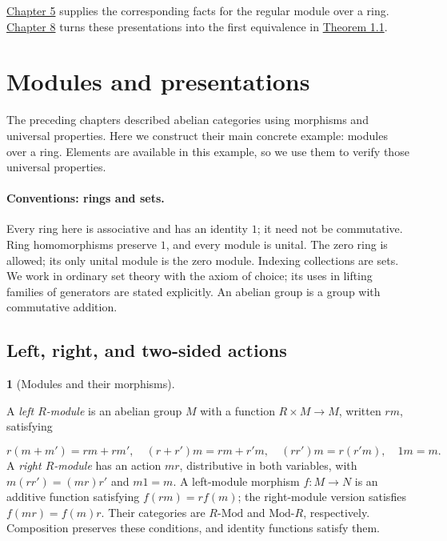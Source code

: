 \documentclass[11pt,a4paper]{article}
\newcommand{\mathheading}{}
\theoremstyle{plain}
\theoremstyle{definition}
\newtheorem*{definitionstatement}{\mathheading}
\newenvironment{mathdefinition}[3]{\renewcommand{\mathheading}{#1 #2}\begin{definitionstatement}[#3]}{\end{definitionstatement}}
\begin{document}
\hyperref[chapter-05]{Chapter 5} supplies the corresponding facts for the regular module over a ring. \hyperref[chapter-08]{Chapter 8} turns these presentations into the first equivalence in \hyperref[env-1-1]{Theorem 1.1}.

 
\section{Modules and presentations}
\label{chapter-05}
  
The preceding chapters described abelian categories using morphisms and universal properties. Here we construct their main concrete example: modules over a ring. Elements are available in this example, so we use them to verify those universal properties.

 

\paragraph{Conventions: rings and sets.}

Every ring here is associative and has an identity \(1\); it need not be commutative. Ring homomorphisms preserve \(1\), and every module is unital. The zero ring is allowed; its only unital module is the zero module. Indexing collections are sets. We work in ordinary set theory with the axiom of choice; its uses in lifting families of generators are stated explicitly. An abelian group is a group with commutative addition.


 
\subsection{Left, right, and two-sided actions}
\label{modules}
 
\begin{mathdefinition}{Definition}{5.1}{Modules and their morphisms}
\label{env-5-1}

A \emph{left \(R\)-module} is an abelian group \(M\) with a function \(R\times M\to M\), written \(rm\), satisfying

 \[
r(m+m')=rm+rm',\quad (r+r')m=rm+r'm,\quad (rr')m=r(r'm),\quad 1m=m.
\] 
A \emph{right \(R\)-module} has an action \(mr\), distributive in both variables, with \(m(rr')=(mr)r'\) and \(m1=m\). A left-module morphism \(f:M\to N\) is an additive function satisfying \(f(rm)=rf(m)\); the right-module version satisfies \(f(mr)=f(m)r\). Their categories are \(R\text{-}\mathrm{Mod}\) and \(\mathrm{Mod}\text{-}R\), respectively. Composition preserves these conditions, and identity functions satisfy them.


\par{}\par

\end{mathdefinition}
 
\end{document}
